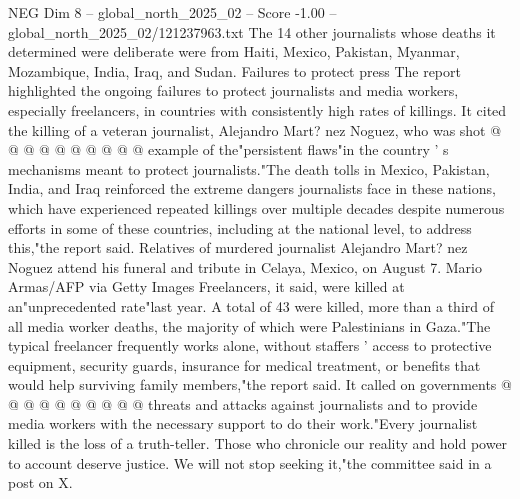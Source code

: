 \begin{textsample}{NEG Dim 8 – global\_north\_2025\_02 – Score -1.00 – global\_north\_2025\_02/121237963.txt}
The 14 other journalists whose deaths it determined were deliberate were from Haiti, Mexico, Pakistan, Myanmar, Mozambique, India, Iraq, and Sudan.
Failures to protect press The report highlighted the ongoing failures to protect journalists and media workers, especially freelancers, in countries with consistently high rates of killings.
It cited the killing of a veteran journalist, Alejandro Mart? nez Noguez, who was shot @ @ @ @ @ @ @ @ @ @ example of the"persistent flaws"in the country ' s mechanisms meant to protect journalists."The death tolls in Mexico, Pakistan, India, and Iraq reinforced the extreme dangers journalists face in these nations, which have experienced repeated killings over multiple decades despite numerous efforts in some of these countries, including at the national level, to address this,"the report said.
Relatives of murdered journalist Alejandro Mart? nez Noguez attend his funeral and tribute in Celaya, Mexico, on August 7.
Mario Armas/AFP via Getty Images Freelancers, it said, were killed at an"unprecedented rate"last year.
A total of 43 were killed, more than a third of all media worker deaths, the majority of which were Palestinians in Gaza."The typical freelancer frequently works alone, without staffers ' access to protective equipment, security guards, insurance for medical treatment, or benefits that would help surviving family members,"the report said.
It called on governments @ @ @ @ @ @ @ @ @ @ threats and attacks against journalists and to provide media workers with the necessary support to do their work."Every journalist killed is the loss of a truth-teller.
Those who chronicle our reality and hold power to account deserve justice.
We will not stop seeking it,"the committee said in a post on X.

\end{textsample}
